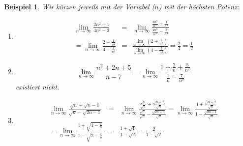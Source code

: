 \documentclass{report}
\newtheorem{myexample}{Beispiel}
\begin{document}
\begin{myexample}Wir kürzen jeweils mit der Variabel ($n$) mit der höchsten Potenz:\begin{enumerate}
\item \begin{eqnarray}\lim_{n \to \infty}\frac{2n^2+1}{4n^2-3} & = & \lim_{n \to \infty}\frac{\frac{2n^2}{n^2}+\frac{1}{n^2}}{\frac{4n^2}{n^2}-\frac{3}{n^2}} \nonumber \\ 
= \lim_{n \to \infty}\frac{2+\frac{1}{n^2}}{4-\frac{3}{n^2}} & = & \frac{\lim_{n \to \infty}(2+\frac{1}{n^2})}{\lim_{n \to \infty}(4-\frac{3}{n^2})} = \frac{2}{4} = \frac{1}{2}\end{eqnarray}
\item \begin{equation}\lim_{n \to \infty}\frac{n^2+2n+5}{n-7} = \lim_{n \to \infty}\frac{1+\frac{2}{n} + \frac{5}{n^2}}{\frac{1}{n} - \frac{7}{n^2}}\end{equation}
existiert nicht.
\item \begin{eqnarray}\lim_{n \to \infty}\frac{\sqrt{n}+\sqrt{n-1}}{\sqrt{n}-\sqrt{2n-1}} & = & \lim_{n \to \infty}\frac{\frac{\sqrt{n}}{\sqrt{n}}+\frac{\sqrt{n-1}}{\sqrt{n}}}{\frac{\sqrt{n}}{\sqrt{n}}-\frac{\sqrt{2n-1}}{\sqrt{n}}} = \lim_{n \to \infty}\frac{1+\frac{\sqrt{n-1}}{\sqrt{n}}}{1-\frac{\sqrt{2n-1}}{\sqrt{n}}} \nonumber \\
= \lim_{n \to \infty}\frac{1+\sqrt{1-\frac{1}{n}}}{1-\sqrt{2-\frac{1}{n}}} &=& \frac{1+\sqrt{1}}{1-\sqrt{2}} = \frac{2}{1-\sqrt{2}}\end{eqnarray}
\end{enumerate}\end{myexample}
\end{document}
